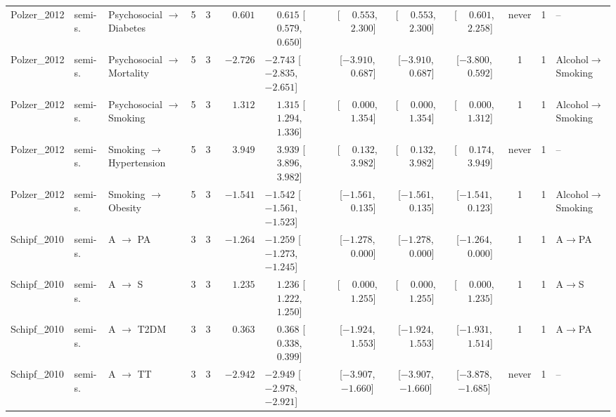 \begin{landscape}
\begin{longtable}{@{}llp{2.15cm}ccrl cccc c l@{}}
Polzer\_2012 & semi-s. & Psychosocial $\to$ Diabetes & 5 & 3 & $\phantom{-}0.601$ & $\phantom{-}0.615$ [$\phantom{-}0.579$, $\phantom{-}0.650$] & [$\phantom{-}0.553$, $\phantom{-}2.300$] & [$\phantom{-}0.553$, $\phantom{-}2.300$] & [$\phantom{-}0.601$, $\phantom{-}2.258$] & never & 1 & -- \\
Polzer\_2012 & semi-s. & Psychosocial $\to$ Mortality & 5 & 3 & $-2.726$ & $-2.743$ [$-2.835$, $-2.651$] & [$-3.910$, $\phantom{-}0.687$] & [$-3.910$, $\phantom{-}0.687$] & [$-3.800$, $\phantom{-}0.592$] & 1 & 1 & Alcohol$\to$Smoking \\
Polzer\_2012 & semi-s. & Psychosocial $\to$ Smoking & 5 & 3 & $\phantom{-}1.312$ & $\phantom{-}1.315$ [$\phantom{-}1.294$, $\phantom{-}1.336$] & [$\phantom{-}0.000$, $\phantom{-}1.354$] & [$\phantom{-}0.000$, $\phantom{-}1.354$] & [$\phantom{-}0.000$, $\phantom{-}1.312$] & 1 & 1 & Alcohol$\to$Smoking \\
Polzer\_2012 & semi-s. & Smoking $\to$ Hypertension & 5 & 3 & $\phantom{-}3.949$ & $\phantom{-}3.939$ [$\phantom{-}3.896$, $\phantom{-}3.982$] & [$\phantom{-}0.132$, $\phantom{-}3.982$] & [$\phantom{-}0.132$, $\phantom{-}3.982$] & [$\phantom{-}0.174$, $\phantom{-}3.949$] & never & 1 & -- \\
Polzer\_2012 & semi-s. & Smoking $\to$ Obesity & 5 & 3 & $-1.541$ & $-1.542$ [$-1.561$, $-1.523$] & [$-1.561$, $\phantom{-}0.135$] & [$-1.561$, $\phantom{-}0.135$] & [$-1.541$, $\phantom{-}0.123$] & 1 & 1 & Alcohol$\to$Smoking \\
Schipf\_2010 & semi-s. & A $\to$ PA & 3 & 3 & $-1.264$ & $-1.259$ [$-1.273$, $-1.245$] & [$-1.278$, $\phantom{-}0.000$] & [$-1.278$, $\phantom{-}0.000$] & [$-1.264$, $\phantom{-}0.000$] & 1 & 1 & A$\to$PA \\
Schipf\_2010 & semi-s. & A $\to$ S & 3 & 3 & $\phantom{-}1.235$ & $\phantom{-}1.236$ [$\phantom{-}1.222$, $\phantom{-}1.250$] & [$\phantom{-}0.000$, $\phantom{-}1.255$] & [$\phantom{-}0.000$, $\phantom{-}1.255$] & [$\phantom{-}0.000$, $\phantom{-}1.235$] & 1 & 1 & A$\to$S \\
Schipf\_2010 & semi-s. & A $\to$ T2DM & 3 & 3 & $\phantom{-}0.363$ & $\phantom{-}0.368$ [$\phantom{-}0.338$, $\phantom{-}0.399$] & [$-1.924$, $\phantom{-}1.553$] & [$-1.924$, $\phantom{-}1.553$] & [$-1.931$, $\phantom{-}1.514$] & 1 & 1 & A$\to$PA \\
Schipf\_2010 & semi-s. & A $\to$ TT & 3 & 3 & $-2.942$ & $-2.949$ [$-2.978$, $-2.921$] & [$-3.907$, $-1.660$] & [$-3.907$, $-1.660$] & [$-3.878$, $-1.685$] & never & 1 & -- \\

\end{longtable}
\end{landscape}
